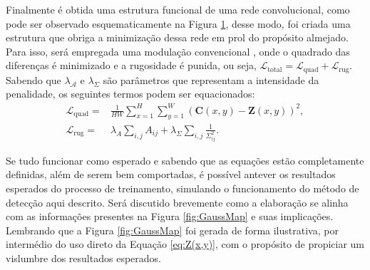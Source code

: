 \documentclass[a4paper, 12pt]{report}
\begin{document}
\begin{figure}[t]
{
}
\label{fig:CnnStructure}
\end{figure}

Finalmente é obtida uma estrutura funcional de uma rede convolucional, como pode ser observado esquematicamente na Figura \ref{fig:CnnStructure}, desse modo, foi criada uma estrutura que obriga a minimização dessa rede em prol do propósito almejado. Para isso, será empregada uma modulação convencional \cite{Mizrahi2002}, onde o quadrado das diferenças é minimizado e a rugosidade é punida, ou seja, $\mathcal{L}_{\text{total}} = \mathcal{L}_{\text{quad}} + \mathcal{L}_{\text{rug}}$. Sabendo que $\lambda_\mathcal{A}$ e $\lambda_\Sigma$ são parâmetros que representam a intensidade da penalidade, os seguintes termos podem ser equacionados:   
\begin{align}
	\mathcal{L}_{\text{quad}} = & \frac{1}{HW} \sum_{x=1}^H \sum_{y=1}^W \left( \mathbf{C}(x,y) - \mathbf{Z}(x,y) \right)^2, \\
	\mathcal{L}_{\text{rug}} = & \lambda_A \sum_{i,j} A_{ij} + \lambda_\Sigma \sum_{i,j} \frac{1}{\Sigma_{ij}^2}.
	\label{eq:loss}
\end{align}

Se tudo funcionar como esperado e sabendo que as equações estão completamente definidas, além de serem bem comportadas, é possível antever os resultados esperados do processo de treinamento, simulando o funcionamento do método de detecção aqui descrito. Será discutido brevemente como a elaboração se alinha com as informações presentes na Figura \ref{fig:GaussMap} e suas implicações. Lembrando que a Figura \ref{fig:GaussMap} foi gerada de forma ilustrativa, por intermédio do uso direto da Equação \ref{eq:Z(x,y)}, com o propósito de propiciar um vislumbre dos resultados esperados.
\end{document}
